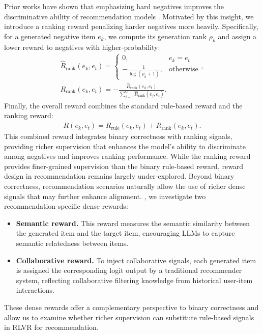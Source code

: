 {%
Prior works have shown that emphasizing hard negatives improves the discriminative ability of recommendation models \citep{SGL, sdpo}.
Motivated by this insight, we introduce a ranking reward penalizing harder negatives more heavily. 
Specifically, for a generated negative item $e_k$, we compute its generation rank $\rho_k$ and assign a lower reward to negatives with higher-probability:
\begin{align}
    \hat{R}_\text{rank}(e_k, e_t)=\begin{cases} 
    0, & e_k=e_t \\
    -\frac{1}{\log(\rho_k+1)}, & \text{otherwise} 
    \end{cases},\\
    R_\text{rank}(e_k,e_t)=-\frac{\hat{R}_\text{rank}(e_k,e_t)}{\sum_{j=1}^G \hat{R}_\text{rank}(e_j,e_t)}. \label{eq:ranking_reward}
\end{align}
Finally, the overall reward combines the standard rule-based reward and the ranking reward:
\begin{align}
    R(e_k,e_t)=R_\text{rule}(e_k,e_t)+R_\text{rank}(e_k,e_t).
\end{align}
This combined reward integrates binary correctness with ranking signals, providing richer supervision that enhances the model’s ability to discriminate among negatives and improves ranking performance.
While the ranking reward provides finer-grained supervision than the binary rule-based reward, reward design in recommendation remains largely under-explored. 
Beyond binary correctness, recommendation scenarios naturally allow the use of richer dense signals that may further enhance alignment. 
, we investigate two recommendation-specific dense rewards: 
\begin{itemize}[leftmargin=*]
    \item \textbf{Semantic reward.} This reward measures the semantic similarity between the generated item and the target item, encouraging LLMs to capture semantic relatedness between items. 
    \item \textbf{Collaborative reward.} To inject collaborative signals, each generated item is assigned the corresponding logit output by a traditional recommender system, reflecting collaborative filtering knowledge from historical user-item interactions.
\end{itemize}
These dense rewards offer a complementary perspective to binary correctness and allow us to examine whether richer supervision can 
substitute rule-based signals in RLVR for recommendation.}

